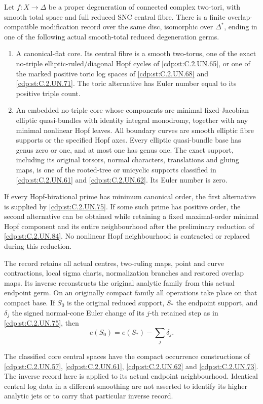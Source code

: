 
\begin{proposition}\label{cdp:st:C.2.UN.85}
Let \(f:X\to\Delta\) be a proper degeneration of connected
complex two-tori, with smooth total space and full reduced
SNC central fibre. There is a finite overlap-compatible
modification record over the same disc, isomorphic over
\(\Delta^*\), ending in one of the following actual
smooth-total reduced degeneration germs.

\begin{enumerate}
\item A canonical-flat core. Its central fibre is a smooth
two-torus, one of the exact no-triple elliptic-ruled/diagonal
Hopf cycles of \ref{cdp:st:C.2.UN.65}, or one of the marked positive toric
log spaces of \ref{cdp:st:C.2.UN.68} and \ref{cdp:st:C.2.UN.71}. The toric alternative has
Euler number equal to its positive triple count.

\item An embedded no-triple core whose components are
minimal fixed-Jacobian elliptic quasi-bundles with identity
integral monodromy, together with any minimal nonlinear
Hopf leaves. All boundary curves are smooth elliptic fibre
supports or the specified Hopf axes. Every elliptic
quasi-bundle base has genus zero or one, and at most one
has genus one. The exact support, including its original
torsors, normal characters, translations and gluing maps,
is one of the rooted-tree or unicyclic supports classified
in \ref{cdp:st:C.2.UN.61} and \ref{cdp:st:C.2.UN.62}. Its Euler number is zero.
\end{enumerate}

If every Hopf-birational prime has minimum canonical order,
the first alternative is supplied by \ref{cdp:st:C.2.UN.75}. If some such
prime has positive order, the second alternative can be
obtained while retaining a fixed maximal-order minimal
Hopf component and its entire neighbourhood after the
preliminary reduction of \ref{cdp:st:C.2.UN.84}. No nonlinear Hopf
neighbourhood is contracted or replaced during this
reduction.

The record retains all actual centres, two-ruling maps,
point and curve contractions, local sigma charts,
normalization branches and restored overlap maps.
Its inverse reconstructs the original analytic family
from this actual endpoint germ. On an originally compact
family all operations take place on that compact base.
If \(S_0\) is the original reduced support, \(S_*\) the
endpoint support, and \(\delta_j\) the signed normal-cone
Euler change of its \(j\)-th retained step as in \ref{cdp:st:C.2.UN.75},
then
\[
                 e(S_0)=e(S_*)-\sum_j\delta_j.
 \tag{C.GP.1}\label{cdp:eq:C.GP.1}
\]

The classified core central spaces have the compact
occurrence constructions of \ref{cdp:st:C.2.UN.57}, \ref{cdp:st:C.2.UN.61}, \ref{cdp:st:C.2.UN.62} and \ref{cdp:st:C.2.UN.73}.
The inverse record here is applied to its actual endpoint
neighbourhood. Identical central log data in a different
smoothing are not asserted to identify its higher analytic
jets or to carry that particular inverse record.
\end{proposition}

